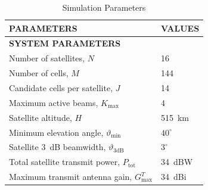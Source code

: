 \documentclass[journal]{IEEEtran}
\newcommand{\revbegin}[1]{\color{revisionblue}\ignorespaces}
\begin{document}
\begin{table}[t]
\revbegin{}
\centering
\caption{Simulation Parameters}
\label{tab:sim_params}
\renewcommand{\arraystretch}{1.08}
\begin{tabular}{l|l}
\hline
\textbf{PARAMETERS} & \textbf{VALUES} \\
\hline
\multicolumn{2}{l}{\textbf{SYSTEM PARAMETERS}} \\
Number of satellites, $N$ & 16 \\
Number of cells, $M$ & 144 \\
Candidate cells per satellite, $J$ & 14 \\
Maximum active beams, $K_{\max}$ & 4 \\
Satellite altitude, $H$ & 515~km \\
Minimum elevation angle, $\vartheta_{\min}$ & $40^\circ$\\
Satellite 3~dB beamwidth, $\vartheta_{3\mathrm{dB}}$ & $3^\circ$ \\
Total satellite transmit power, $P_{\mathrm{tot}}$ & 34~dBW \\
Maximum transmit antenna gain, $G_{\max}^T$ & 34~dBi \\


\end{tabular}
\end{table}
\end{document}
